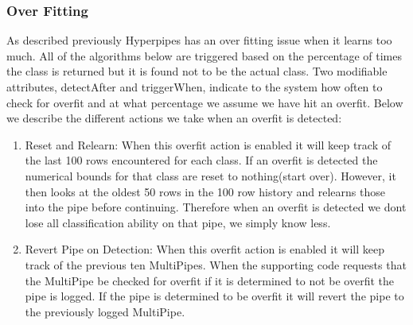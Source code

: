 \subsubsection{Over Fitting}
As described previously Hyperpipes has an over fitting issue 
when it learns too much. All of the algorithms below are triggered 
based on the percentage of times the class is returned but it is 
found not to be the actual class. Two modifiable attributes, detectAfter
and triggerWhen, indicate to the system how often to check for 
overfit and at what percentage we assume we have hit an overfit. 
Below we describe the different actions we take when an overfit
is detected:
\begin{enumerate}
\item Reset and Relearn: 
	When this overfit action is enabled it will keep track of the 
	last 100 rows encountered for each class. If an overfit is detected 
	the numerical bounds for that class are reset to nothing(start over).
	However, it then looks at the oldest 50 rows in the 100 row history 
	and relearns those into the pipe before continuing. Therefore when
	an overfit is detected we dont lose all classification ability on that
	pipe, we simply know less.
\item Revert Pipe on Detection:
	When this overfit action is enabled it will keep track of the previous
	ten MultiPipes. When the supporting code requests that the MultiPipe
	be checked for overfit if it is determined to not be overfit the 
	pipe is logged. If the pipe is determined to be overfit it will revert 
	the pipe to the previously logged MultiPipe.
	
\end{enumerate}


